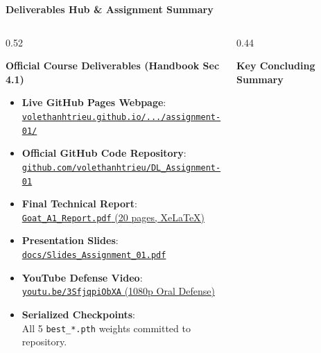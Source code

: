 \documentclass[aspectratio=169, 10pt]{beamer}
\begin{document}
\begin{frame}{\textbf{Deliverables Hub \& Assignment Summary}}
  \begin{columns}[c]
    \begin{column}{0.52\textwidth}
      \begin{block}{\textbf{Official Course Deliverables (Handbook Sec 4.1)}}
        \begin{itemize}\scriptsize
          \item \textbf{Live GitHub Pages Webpage}: \\
          \href{https://volethanhtrieu.github.io/Deep-Learning-project-main-page/assignment-01/}{\tiny\texttt{volethanhtrieu.github.io/.../assignment-01/}}
          \item \textbf{Official GitHub Code Repository}: \\
          \href{https://github.com/volethanhtrieu/DL_Assignment-01}{\tiny\texttt{github.com/volethanhtrieu/DL\_Assignment-01}}
          \item \textbf{Final Technical Report}: \\
          \href{https://github.com/volethanhtrieu/DL_Assignment-01/blob/main/docs/Report_Assignment_01.pdf}{\tiny\texttt{Goat\_A1\_Report.pdf} (20 pages, XeLaTeX)}
          \item \textbf{Presentation Slides}: \\
          \href{https://github.com/volethanhtrieu/DL_Assignment-01/blob/main/docs/Slides_Assignment_01.pdf}{\tiny\texttt{docs/Slides\_Assignment\_01.pdf}}
          \item \textbf{YouTube Defense Video}: \\
          \href{https://youtu.be/3SfjqpiObXA}{\tiny\texttt{youtu.be/3SfjqpiObXA} (1080p Oral Defense)}
          \item \textbf{Serialized Checkpoints}: \\
          All 5 \texttt{best\_*.pth} weights committed to repository.
        \end{itemize}
      \end{block}
    \end{column}
    \begin{column}{0.44\textwidth}
      \begin{block}{\textbf{Key Concluding Summary}}
        \scriptsize
        \begin{itemize}

\end{itemize}
\end{block}
\end{column}
\end{columns}
\end{frame}
\end{document}
